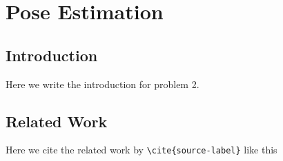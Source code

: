 \chapter{Pose Estimation} \label{ch:2-pose-estimation}

\section{Introduction} \label{sec:2-pose-estimation-introduction}
Here we write the introduction for problem 2.

\section{Related Work} \label{sec:2-pose-estimation-related-work}

Here we cite the related work by \texttt{\textbackslash cite\{source-label\}} like this \cite{recent-progress-in-technologies-for-tactile-sensors}
